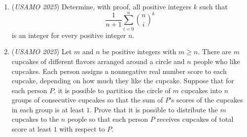 \begin{enumerate}
 

	\item (\textit{USAMO 2025}) Determine, with proof, all positive integers $k$ such that
 \[\frac{1}{n+1} \sum_{i=0}^n \binom{n}{i}^k\]is an integer for every positive integer $n.$


	\item (\textit{USAMO 2025}) Let $m$ and $n$ be positive integers with $m\geq n$. There are $m$ cupcakes of different flavors arranged around a circle and $n$ people who like cupcakes. Each person assigns a nonnegative real number score to each cupcake, depending on how much they like the cupcake. Suppose that for each person $P$, it is possible to partition the circle of $m$ cupcakes into $n$ groups of consecutive cupcakes so that the sum of $P$'s scores of the cupcakes in each group is at least $1$. Prove that it is possible to distribute the $m$ cupcakes to the $n$ people so that each person $P$ receives cupcakes of total score at least $1$ with respect to $P$.


 

\end{enumerate}